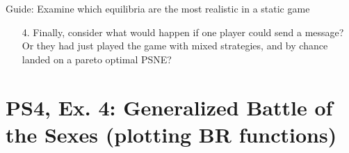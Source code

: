 \begin{frame}{Guide: Examine which equilibria are the most realistic in a static game}
\begin{multicols}{2}
\begin{itemize}
      \item[4.] Finally, consider what would happen if one player could send a message? Or they had just played the game with mixed strategies, and by chance landed on a pareto optimal PSNE?
    \end{itemize}
    \vfill\null
  \end{multicols}
\end{frame}


\section{PS4, Ex. 4: Generalized Battle of the Sexes (plotting BR functions)}

